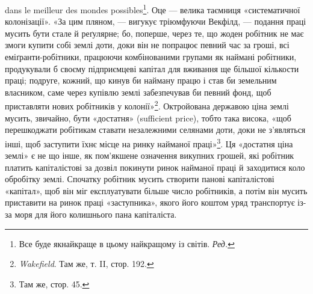 dans le meilleur des mondes possibles\footnote*{
Все буде якнайкраще в цьому найкращому із світів. \emph{Ред.}}. Оце — велика таємниця «систематичної колонізації». «За цим
пляном, — вигукує тріюмфуючи Векфілд, —
подання праці мусить бути стале й реґулярне; бо, поперше, через те, що жоден робітник не має змоги
купити собі землі доти, доки він не попрацює певний час за гроші, всі еміґранти-робітники, працюючи
комбінованими групами як наймані робітники, продукували б своєму підприємцеві капітал для вживання
ще більшої кількости праці; подруге, кожний, що кинув би найману працю і став би земельним
власником, саме через купівлю землі забезпечував би певний фонд, щоб приставляти
нових робітників у колонії»\footnote{
\emph{Wakefield}. Там же, т. II, стор. 192.
}. Октройована державою ціна землі мусить, звичайно, бути
«достатня» (sufficient price), тобто така висока, «щоб перешкоджати робітикам ставати незалежними
селянами доти, доки не з’являться інші, щоб заступити їхнє місце на ринку найманої праці»\footnote{
Там же, стор. 45.
}. Ця
«достатня ціна землі» є не що інше, як пом’якшене означення викупних грошей, які робітник платить
капіталістові за дозвіл покинути ринок найманої праці й заходитися коло обробітку землі. Спочатку
робітник мусить створити панові капіталістові «капітал», щоб він міг експлуатувати більше число
робітників, а потім він мусить приставити на ринок праці «заступника», якого його коштом уряд
транспортує із-за моря для його колишнього пана капіталіста.

